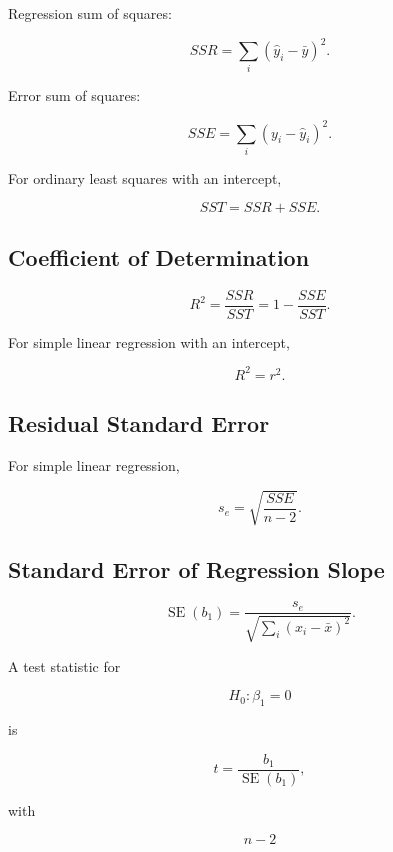 Regression sum of squares:

\[
\boxed{
SSR
=
\sum_i
(\hat y_i-\bar y)^2.
}
\]

Error sum of squares:

\[
\boxed{
SSE
=
\sum_i
(y_i-\hat y_i)^2.
}
\]

For ordinary least squares with an intercept,

\[
\boxed{
SST
=
SSR+SSE.
}
\]

\subsection{Coefficient of Determination}
\label{subsec:r-squared-reference}

\[
\boxed{
R^2
=
\frac{
SSR
}{
SST
}
=
1-
\frac{
SSE
}{
SST
}.
}
\]

For simple linear regression with an intercept,

\[
\boxed{
R^2=r^2.
}
\]

\subsection{Residual Standard Error}
\label{subsec:residual-standard-error}

For simple linear regression,

\[
\boxed{
s_e
=
\sqrt{
\frac{
SSE
}{
n-2
}
}.
}
\]

\subsection{Standard Error of Regression Slope}
\label{subsec:slope-standard-error}

\[
\boxed{
\operatorname{SE}(b_1)
=
\frac{
s_e
}{
\sqrt{
\sum_i
(x_i-\bar{x})^2
}
}.
}
\]

A test statistic for

\[
H_0:\beta_1=0
\]

is

\[
\boxed{
t
=
\frac{
b_1
}{
\operatorname{SE}(b_1)
},
}
\]

with

\[
\boxed{
n-2
}
\]

